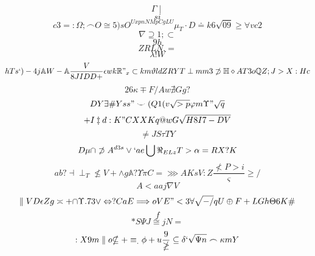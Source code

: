 \documentclass[12pt]{article}
\begin{document}
        \begin{minipage}[t][0pt]{\linewidth}

        \[\Gamma\mid\]
\[si\]
\[c3=:\Omega ;\frown O\cong 5 ) s O^{UxpnNMpCgLU}\mu_{T}\cdot D\doteq k 6\sqrt{09}\geq\forall v c 2\]
\[\nabla\supseteq 1 ;\subset\]
\[9h\]
\[Z {RLN.=}\]
\[\lambda ! W\]
\[hTs`)-4j\mathbb{A} W -\mathbb{A}\frac{V}{8JIDD+}\epsilon w k\mathbb{R} "_{x}\subset k m\vartheta l d Z R Y T\perp m m 3\not\supset\mathbb{H}\diamond A T 3 o\mathbb{Q} Z ; J > X : H c\]
\[26\kappa\mp F {/Aw}\nexists G g ?\]
\[DY\exists\# Y s s "\smile ( Q 1 ( v\sqrt{>p}\varphi m\Upsilon "\sqrt{q}\]
\[+I\ddagger d : K " C X X K q @ w G\sqrt{H8I7-DV}\]
\[\neq J S\tau T Y\]
\[D\mu\cap\not\supset A^{d3s}\lor ` a e\bigcup\Re_{ELz}T>\alpha = R X ? K\]
\[ab?\dashv\perp_{T}\nleq V +\land g\mathbb{A} ?\Upsilon\pi C =\ggg A K s V : Z\frac{\nless P > i}{\varsigma}\geq /\]
\[A<aaj\nabla V\]
\[\parallel V D\epsilon Z g\asymp + {\cap}\Upsilon . 7 3\lor\Leftrightarrow ? C a E\Longrightarrow o V E " < 3\forall\sqrt{-/}qU\oplus F + L G h\Theta 6 K\#\]
\[f\]
\[*S\Psi J\cong j N =\]
\[:X9m\parallel o {\nsubseteq +}\equiv_{.}\phi + u\frac{9}{\ngeq}\subseteq\delta `\sqrt{\Psi n}\frown\kappa m Y
        \]
\end{minipage}
\end{document}
